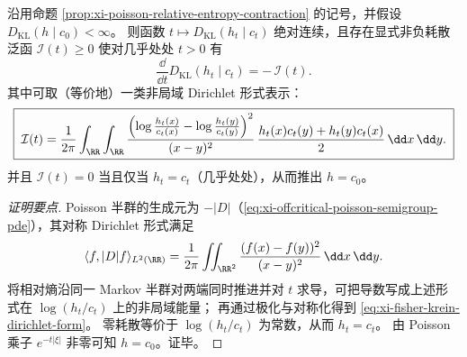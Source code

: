 \begin{proposition}\label{prop:xi-poisson-relative-entropy-fisher-krein}
沿用命题 \ref{prop:xi-poisson-relative-entropy-contraction} 的记号，并假设 \(D_{\mathrm{KL}}(h\mid c_0)<\infty\)。
则函数
\(
t\mapsto D_{\mathrm{KL}}(h_t\mid c_t)
\)
绝对连续，且存在显式非负耗散泛函 \(\mathcal{I}(t)\ge 0\) 使对几乎处处 \(t>0\) 有
\begin{equation}\label{eq:xi-fisher-krein-dissipation}
\boxed{\;
\frac{\dd}{\dd t}D_{\mathrm{KL}}(h_t\mid c_t)=-\,\mathcal{I}(t).\;}
\end{equation}
其中可取（等价地）一类非局域 Dirichlet 形式表示：
\begin{equation}\label{eq:xi-fisher-krein-dirichlet-form}
\boxed{\;
\mathcal I(t)=\frac{1}{2\pi}\int_{\RR}\int_{\RR}
\frac{\Bigl(\log\frac{h_t(x)}{c_t(x)}-\log\frac{h_t(y)}{c_t(y)}\Bigr)^2}{(x-y)^2}\,
\frac{h_t(x)c_t(y)+h_t(y)c_t(x)}{2}\,\dd x\,\dd y.\;}
\end{equation}
并且 \(\mathcal{I}(t)=0\) 当且仅当 \(h_t=c_t\)（几乎处处），从而推出 \(h=c_0\)。
\end{proposition}

\begin{proof}[证明要点]
Poisson 半群的生成元为 \(-|D|\)（\eqref{eq:xi-offcritical-poisson-semigroup-pde}），其对称 Dirichlet 形式满足
\[
\langle f,|D|f\rangle_{L^2(\RR)}
=\frac{1}{2\pi}\iint_{\RR^2}\frac{(f(x)-f(y))^2}{(x-y)^2}\,\dd x\,\dd y.
\]
将相对熵沿同一 Markov 半群对两端同时推进并对 \(t\) 求导，可把导数写成上述形式在 \(\log(h_t/c_t)\) 上的非局域能量；
再通过极化与对称化得到 \eqref{eq:xi-fisher-krein-dirichlet-form}。
零耗散等价于 \(\log(h_t/c_t)\) 为常数，从而 \(h_t=c_t\)。
由 Poisson 乘子 \(e^{-t|\xi|}\) 非零可知 \(h=c_0\)。证毕。
\end{proof}

